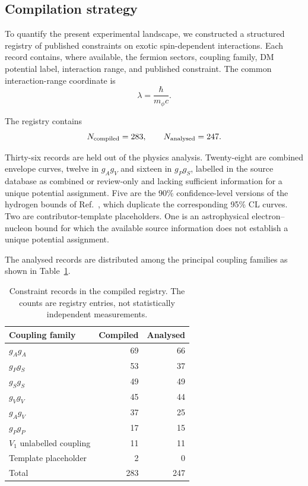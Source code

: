 \documentclass[aps,prd,reprint,superscriptaddress,nofootinbib]{revtex4-2}
\begin{document}
	\subsection{Compilation strategy}
	
	To quantify the present experimental landscape, we constructed a
	structured registry of published constraints on exotic spin-dependent
	interactions. Each record contains, where available, the fermion
	sectors, coupling family, DM potential label, interaction range, and
	published constraint. The common interaction-range coordinate is
	\begin{equation}
		\lambda=\frac{\hbar}{m_\phi c}.
	\end{equation}
	
	The registry contains
	\begin{equation}
		N_{\rm compiled}=283,
		\qquad
		N_{\rm analysed}=247.
		\label{eq:Nrecords}
	\end{equation}
	
	Thirty-six records are held out of the physics analysis.
Twenty-eight are combined envelope curves, twelve in $g_Ag_V$ and sixteen
in $g_Pg_S$, labelled in the source database as combined or review-only
and lacking sufficient information for a unique potential assignment.
Five are the 90\% confidence-level versions of the hydrogen bounds of
Ref.~\cite{Cong2025b}, which duplicate the corresponding 95\% CL curves.
Two are contributor-template placeholders. One is an astrophysical
electron--nucleon bound for which the available source information does
not establish a unique potential assignment.
	
	The analysed records are distributed among the principal coupling
	families as shown in Table~\ref{tab:families}.
	
	\begin{table}[t]
		\caption{Constraint records in the compiled registry. The counts are
			registry entries, not statistically independent measurements.}
		\label{tab:families}
		\begin{ruledtabular}
			\begin{tabular}{lrr}
				Coupling family & Compiled & Analysed\\
				\hline
				$g_Ag_A$ & 69 & 66\\
				$g_Pg_S$ & 53 & 37\\
				$g_Sg_S$ & 49 & 49\\
				$g_Vg_V$ & 45 & 44\\
				$g_Ag_V$ & 37 & 25\\
				$g_Pg_P$ & 17 & 15\\
				$V_1$ unlabelled coupling & 11 & 11\\
				Template placeholder & 2 & 0\\
				\hline
				Total & 283 & 247
			\end{tabular}
		\end{ruledtabular}
	\end{table}
	
\end{document}
